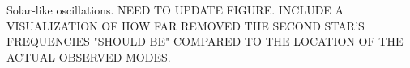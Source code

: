 \label{fig:seismo} Solar-like oscillations. NEED TO UPDATE FIGURE. INCLUDE A VISUALIZATION OF HOW FAR REMOVED THE SECOND STAR'S FREQUENCIES "SHOULD BE" COMPARED TO THE LOCATION OF THE ACTUAL OBSERVED MODES.